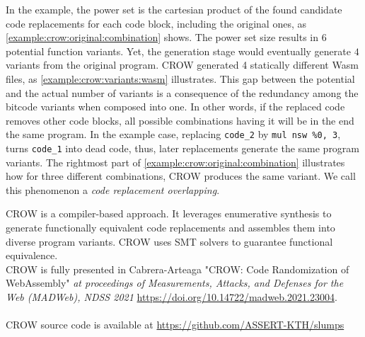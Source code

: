 In the example, the power set is the cartesian product of the found candidate code replacements for each code block, including the original ones, as \autoref{example:crow:original:combination} shows. The power set size results in $6$ potential function variants. Yet, the generation stage would eventually generate $4$ variants from the original program. CROW generated 4 statically different Wasm  files, as \autoref{example:crow:variants:wasm} illustrates. This gap between the potential and the actual number of variants is a consequence of the redundancy among the bitcode variants when composed into one. In other words, if the replaced code removes other code blocks, all possible combinations having it will be in the end the same program. In the example case, replacing \texttt{code\_2} by \texttt{mul nsw \%0, 3}, turns \texttt{code\_1} into dead code, thus, later replacements generate the same program variants. The rightmost part of \autoref{example:crow:original:combination} illustrates how for three different combinations, CROW produces the same variant. We call this phenomenon a \emph{code replacement overlapping}.



\begin{tcolorbox}[title=Contribution paper and artifact,boxrule=1pt,arc=.2em,boxsep=1.0mm]
    CROW is a compiler-based approach.
    It leverages enumerative synthesis to generate functionally equivalent code replacements and assembles them into diverse \wasm program variants. 
    CROW uses SMT solvers to guarantee functional equivalence. \\
    CROW is fully presented in Cabrera-Arteaga \etal "CROW: Code Randomization of WebAssembly"
    \emph{at proceedings of Measurements, Attacks, and Defenses for the Web (MADWeb), NDSS 2021}
    \url{https://doi.org/10.14722/madweb.2021.23004}. 
    \\\\
    CROW source code is available at \url{https://github.com/ASSERT-KTH/slumps}

\end{tcolorbox}

